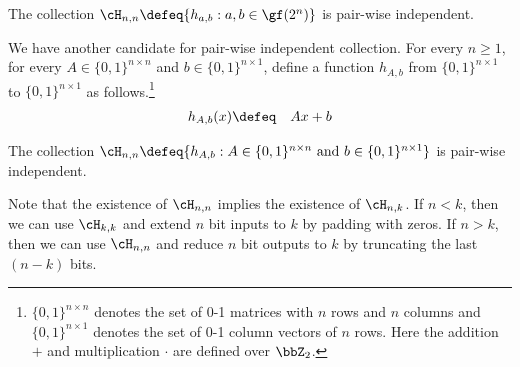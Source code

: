 \documentclass[11pt, a4paper]{article}
\begin{document}
\begin{theorem}
\label{theo:hash-exists-a}
The collection $\cH_{n,n} \defeq \{h_{a,b}: a,b \in \gf(2^n)\}$
is pair-wise independent.
\end{theorem}


We have another candidate for pair-wise independent collection.
For every $n\geq 1$, for every $A \in \{0,1\}^{n\times n}$ and $b \in \{0,1\}^{n\times 1}$,
define a function $h_{A,b}$ from $\{0,1\}^{n\times 1}$ to $\{0,1\}^{n\times 1}$
 as follows.\footnote{$\{0,1\}^{n\times n}$ denotes the set of 0-1 matrices with $n$ rows and $n$ columns
and $\{0,1\}^{n\times 1}$ denotes the set of 0-1 column vectors of $n$ rows.
Here the addition $+$ and multiplication $\cdot$ are defined over $\bbZ_2$.}
\begin{eqnarray*}
h_{A,b}(x) &\defeq & A x+b
\end{eqnarray*}

\begin{theorem}
\label{theo:hash-exists-b}
The collection $\cH_{n,n} \defeq \{h_{A,b} : A \in \{0,1\}^{n\times n}\ \text{and}\ b \in \{0,1\}^{n\times 1}\}$ 
is pair-wise independent.
\end{theorem}


\begin{remark}
Note that the existence of $\cH_{n,n}$ implies the existence of $\cH_{n,k}$.
If $n<k$, then we can use $\cH_{k,k}$ and extend $n$ bit inputs to $k$
by padding with zeros.
If $n>k$, then we can use $\cH_{n,n}$ and reduce $n$ bit outputs to $k$
by truncating the last $(n-k)$ bits.
\end{remark}
\end{document}
